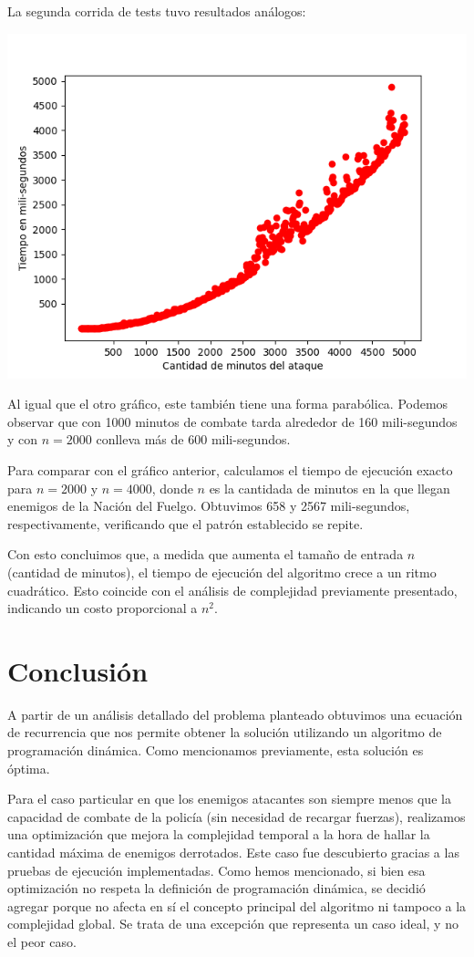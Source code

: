 \documentclass{article}
\begin{document}
La segunda corrida de tests tuvo resultados análogos:

\includegraphics[scale=0.69]{graficoComplejidad.png}

Al igual que el otro gráfico, este también tiene una forma parabólica. Podemos observar que con 1000 minutos de combate tarda alrededor de 160 mili-segundos y con $n = 2000$ conlleva más de 600 mili-segundos. 

Para comparar con el gráfico anterior, calculamos el tiempo de ejecución exacto para $n = 2000$ y $n = 4000$, donde $n$ es la cantidada de minutos en la que llegan enemigos de la Nación del Fuelgo. Obtuvimos 658 y 2567 mili-segundos, respectivamente, verificando que el patrón establecido se repite.

Con esto concluimos que, a medida que aumenta el tamaño de entrada $n$ (cantidad de minutos), el tiempo de ejecución del algoritmo crece a un ritmo cuadrático. Esto coincide con el análisis de complejidad previamente presentado, indicando un costo proporcional a $n^2$.

\section{Conclusión}

A partir de un análisis detallado del problema planteado obtuvimos una ecuación de recurrencia que nos permite obtener la solución utilizando un algoritmo de programación dinámica. Como mencionamos previamente, esta solución es óptima. 

Para el caso particular en que los enemigos atacantes son siempre menos que la capacidad de combate de la policía (sin necesidad de recargar fuerzas), realizamos una optimización que mejora la complejidad temporal a la hora de hallar la cantidad máxima de enemigos derrotados. Este caso fue descubierto gracias a las pruebas de ejecución implementadas. Como hemos mencionado, si bien esa optimización no respeta la definición de programación dinámica, se decidió agregar porque no afecta en sí el concepto principal del algoritmo ni tampoco a la complejidad global. Se trata de una excepción que representa un caso ideal, y no el peor caso.
\end{document}
